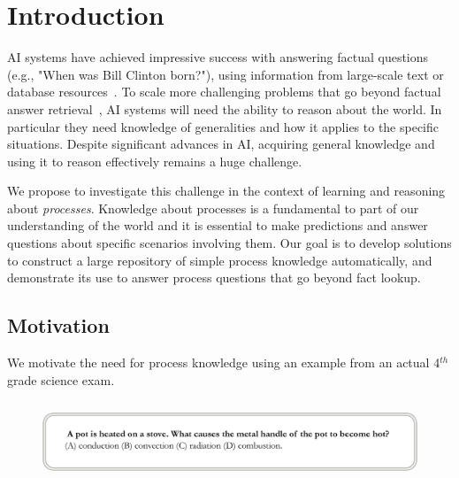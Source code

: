 \section{Introduction}

AI systems have achieved impressive success with answering factual questions 
(e.g., "When was Bill Clinton born?"), using information from large-scale text or database resources~\cite{berant2013semantic,fader2014open,bordes2014open,reddy2014large,watson}. 
To scale more challenging problems that go beyond factual answer retrieval~\cite{richardson2013mctest,clark2015elementary,berantSrikumar14}, 
AI systems will need the ability to reason about the world. 
In particular they need knowledge of generalities and how it applies to the specific situations. Despite significant advances in AI, acquiring 
general knowledge and using it to reason effectively remains a huge challenge.

We propose to investigate this challenge in the context of learning and reasoning about {\em processes}.
Knowledge about processes is a fundamental to part of our understanding of the world and it is 
essential to make predictions and answer questions about specific scenarios involving them.
Our goal is to develop solutions to construct a large repository of simple process knowledge 
automatically, and demonstrate its use to answer process questions that go beyond fact lookup. 

\subsection{Motivation}
We motivate the need for process knowledge using an example from an actual 4$^{th}$ grade science exam.
\begin{figure}[hbt]
	\begin{center}
	\vspace{-1em}
	\includegraphics[width=6.04in,height=0.95in]{figures/single-question-stretch.pdf} 	
	\vspace{-1em}
	\end{center}
\end{figure}

